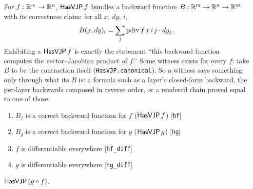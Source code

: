 \begin{definition}
  \label{def:hasvjp}
  \leanok
  For \(f : \mathbb{R}^{m} \to \mathbb{R}^{n}\), \(\mathsf{HasVJP}\, f\) bundles a backward
  function \(B : \mathbb{R}^{m} \to \mathbb{R}^{n} \to \mathbb{R}^{m}\) with its
  correctness claim: for all \(x\), \(dy\), \(i\),
  \[
    B(x, dy)_i = \sum_j \operatorname{pdiv} f\, x\, i\, j \cdot dy_j.
  \]
  Exhibiting a \(\mathsf{HasVJP}\, f\) is exactly the statement ``this backward
  function computes the vector--Jacobian product of \(f\).'' Some witness
  exists for every \(f\): take \(B\) to be the contraction itself
  (\texttt{HasVJP.canonical}). So a witness says something only through
  what its \(B\) is: a formula such as a layer's closed-form backward, the
  per-layer backwards composed in reverse order, or a rendered chain proved
  equal to one of those.
\end{definition}

\begin{theorem}
  \label{thm:vjpComp}
  \leanok
  \Assume{}
  \begin{enumerate}
    \item \(B_f\) is a correct backward function for \(f\)
          (\(\mathsf{HasVJP}\, f\)) \hfill[\texttt{hf}]
    \item \(B_g\) is a correct backward function for \(g\)
          (\(\mathsf{HasVJP}\, g\)) \hfill[\texttt{hg}]
    \item \(f\) is differentiable everywhere \hfill[\texttt{hf\_diff}]
    \item \(g\) is differentiable everywhere \hfill[\texttt{hg\_diff}]
  \end{enumerate}
  \Prove{} \(\mathsf{HasVJP}\, (g \circ f)\).
\end{theorem}


